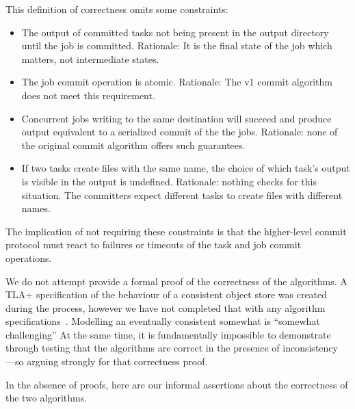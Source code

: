\documentclass[conference]{IEEEtran}
\begin{document}
This definition of correctness omits some constraints:

\begin{itemize}
  \item The output of committed tasks not being present in the output directory
  until the job is committed.
  Rationale: It is the final state of the job which matters, not intermediate states.

  \item The job commit operation is atomic.
  Rationale: The v1 commit algorithm does not meet this requirement.

  \item Concurrent jobs writing to the same destination will succeed and
  produce output equivalent to a serialized commit of the the jobs.
  Rationale: none of the original commit algorithm offers such guarantees.

  \item If two tasks create files with the same name, the choice of which
  task's output is visible in the output is undefined.
  Rationale: nothing checks for this situation. The committers expect different
  tasks to create files with different names.

\end{itemize}

The implication of not requiring these constraints is that the higher-level
commit protocol must react to failures or timeouts of the task and job
commit operations.



We do not attempt provide a formal proof of the correctness of the algorithms.
A TLA+ specification of the behaviour of a consistent object store was created
during the process, however we have not completed that with any
algorithm specifications\ \cite{s3-tla}.
Modelling an eventually consistent somewhat is ``somewhat challenging''
At the same time, it is fundamentally impossible to demonstrate through testing
that the algorithms are correct in the presence of inconsistency ---so arguing
strongly for that correctness proof.

In the absence of proofs,
here are our informal assertions about the correctness of the two algorithms.
\end{document}
